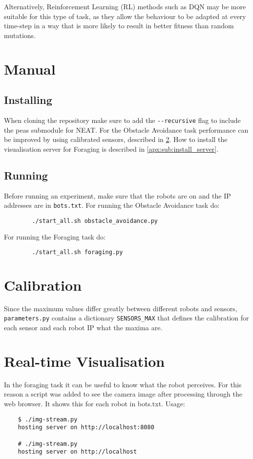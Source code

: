 \documentclass{article}
\begin{document}
	Alternatively, Reinforcement Learning (RL) methods such as DQN
	\cite{mnih2013playing} may be more suitable for this type of task, as they
	allow the behaviour to be adapted at every time-step in a way that is more
	likely to result in better fitness than random mutations.

	\appendix
	\section{Manual} %
	\label{apx:sec:manual}
	\subsection{Installing} %
	\label{sub:installing}
	When cloning the repository make sure to add the \texttt{{-}{-}recursive}
	flag to include the peas submodule for NEAT.
	For the Obstacle Avoidance task performance can be improved by using
	calibrated sensors, described in \ref{apx:sec:calibration}. How to install
	the visualisation server for Foraging is described in
	\ref{apx:sub:install_server}.

	\subsection{Running} %
	\label{apx:sub:running}
	Before running an experiment, make sure that the robots are on and the IP
	addresses are in \texttt{bots.txt}.
	For running the Obstacle Avoidance task do:
	\begin{verbatim}
		./start_all.sh obstacle_avoidance.py
	\end{verbatim}
	For running the Foraging task do:
	\begin{verbatim}
		./start_all.sh foraging.py
	\end{verbatim}

	\section{Calibration} %
	\label{apx:sec:calibration}
	Since the maximum values differ greatly between different robots and
	sensors, \texttt{parameters.py} contains a dictionary \texttt{SENSORS\_MAX}
	that defines the calibration for each sensor and each robot IP what the
	maxima are.

	\section{Real-time Visualisation} %
	\label{apx:sec:visualisation}
	In the foraging task it can be useful to know what the robot perceives. For
	this reason a script was added to see the camera image after processing
	through the web browser. It shows this for each robot in bots.txt. Usage:
	\begin{verbatim}
	$ ./img-stream.py
	hosting server on http://localhost:8080

	# ./img-stream.py
	hosting server on http://localhost
	\end{verbatim}
\end{document}
